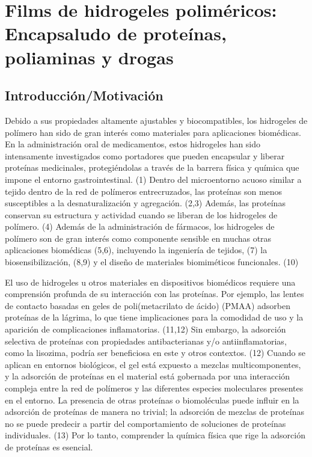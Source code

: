 
\chapter{Films de hidrogeles polim\'ericos: Encapsaludo de prote\'inas, poliaminas y drogas}
\label{Chapter-film} %

\section{Introducci\'on/Motivaci\'on}

Debido a sus propiedades altamente ajustables y biocompatibles, los hidrogeles de pol\'imero han sido de gran inter\'es como materiales para aplicaciones biom\'edicas. En la administraci\'on oral de medicamentos, estos hidrogeles han sido intensamente investigados como portadores que pueden encapsular y liberar prote\'inas medicinales, protegi\'endolas a trav\'es de la barrera f\'isica y qu\'imica que impone el entorno gastrointestinal. (1) Dentro del microentorno acuoso similar a tejido dentro de la red de pol\'imeros entrecruzados, las prote\'inas son menos susceptibles a la desnaturalizaci\'on y agregaci\'on. (2,3) Adem\'as, las prote\'inas conservan su estructura y actividad cuando se liberan de los hidrogeles de pol\'imero. (4) Adem\'as de la administraci\'on de f\'armacos, los hidrogeles de pol\'imero son de gran inter\'es como componente sensible en muchas otras aplicaciones biom\'edicas (5,6), incluyendo la ingenier\'ia de tejidos, (7) la biosensibilizaci\'on, (8,9) y el dise\~no de materiales biomim\'eticos funcionales. (10)

El uso de hidrogeles u otros materiales en dispositivos biom\'edicos requiere una comprensi\'on profunda de su interacci\'on con las prote\'inas. Por ejemplo, las lentes de contacto basadas en geles de poli(metacrilato de \'acido) (PMAA) adsorben prote\'inas de la l\'agrima, lo que tiene implicaciones para la comodidad de uso y la aparición de complicaciones inflamatorias. (11,12) Sin embargo, la adsorci\'on selectiva de prote\'inas con propiedades antibacterianas y/o antiinflamatorias, como la lisozima, podr\'ia ser beneficiosa en este y otros contextos. (12) Cuando se aplican en entornos biol\'ogicos, el gel est\'a expuesto a mezclas multicomponentes, y la adsorci\'on de prote\'inas en el material est\'a gobernada por una interacci\'on compleja entre la red de pol\'imeros y las diferentes especies moleculares presentes en el entorno. La presencia de otras prote\'inas o biomol\'eculas puede influir en la adsorci\'on de prote\'inas de manera no trivial; la adsorci\'on de mezclas de prote\'inas no se puede predecir a partir del comportamiento de soluciones de prote\'inas individuales. (13) Por lo tanto, comprender la qu\'imica f\'isica que rige la adsorci\'on de prote\'inas es esencial.

